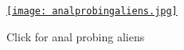 \begin{figure}[htbp]
\centering
\href{http://www.youtube.com/watch?v=xz7sBTHtcLU}{\texttt{[image: analprobingaliens.jpg]}}
\caption{Click for anal probing aliens}
\label{fig:analprobe}
\end{figure}










%